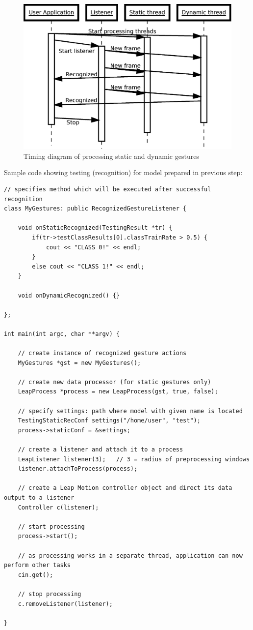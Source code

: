 \begin{figure}[htb]
\centering
 \includegraphics[width=0.8\columnwidth]{figures/timeline.eps}
 \caption[]{Timing diagram of processing static and dynamic gestures}
 \label{processingtimeline}
\end{figure}

Sample code showing testing (recognition) for model prepared in previous step:
\begin{lstlisting}
// specifies method which will be executed after successful recognition
class MyGestures: public RecognizedGestureListener {

	void onStaticRecognized(TestingResult *tr) {
		if(tr->testClassResults[0].classTrainRate > 0.5) {
			cout << "CLASS 0!" << endl;
		}
		else cout << "CLASS 1!" << endl;
	}

	void onDynamicRecognized() {}

};

int main(int argc, char **argv) {

	// create instance of recognized gesture actions
	MyGestures *gst = new MyGestures();

	// create new data processor (for static gestures only)
	LeapProcess *process = new LeapProcess(gst, true, false);

	// specify settings: path where model with given name is located
	TestingStaticRecConf settings("/home/user", "test");
	process->staticConf = &settings;
	
	// create a listener and attach it to a process
	LeapListener listener(3);	// 3 = radius of preprocessing windows
	listener.attachToProcess(process);
	
	// create a Leap Motion controller object and direct its data output to a listener
	Controller c(listener);

	// start processing
	process->start();
	
	// as processing works in a separate thread, application can now perform other tasks
	cin.get();
	
	// stop processing
	c.removeListener(listener);

}
\end{lstlisting}

